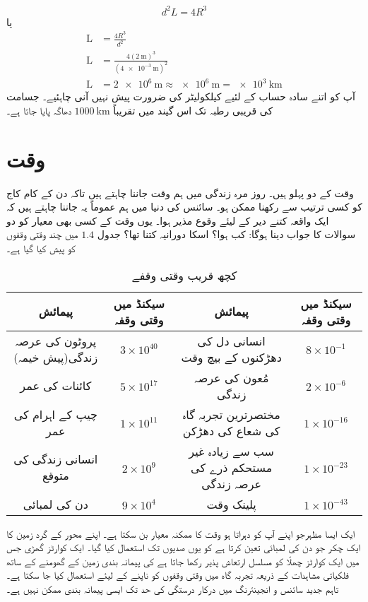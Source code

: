 \documentclass[leqno, b5paper]{khalid-urdu-book}
\begin{document}
	\[d^{2}L =4R^{3}\]
	یا
	\begin{align*}
		\text{L} &= \frac{4R^{3}}{d^{2}}\\
		\text{L} &= \frac{4\left(\SI{2}{\meter}\right)^{3}}{\left(\SI{4 e-3}{\meter}\right)^{2}}\\
		\text{L} &= \SI{2e6}{\meter}\approx\SI{e6}{\meter} =\SI{e3}{\kilo\meter}
	\end{align*}
	آپ کو اتنے سادہ حساب کے لئیے کیلکولیٹر کی ضرورت پیش نہیں آنی چاہئیے۔ جسامت کی قریبی رطبہ تک اس گیند میں تقریباً $\SI{1000}{\kilo\meter}$ دھاگہ پایا جاتا ہے۔
	\section{وقت}
	وقت کے دو پہلو ہیں۔ روز مرہ زندگی میں ہم وقت جاننا چاہتے ہیں تاکہ دن کے کام کاج کو کسی ترتیب سے رکھنا ممکن ہو۔ سائنس کی دنیا میں ہم عموماً یہ جاننا چاہتے ہیں کہ ایک واقعہ کتنے دیر کے لیئے وقوع مذیر ہوا۔ یوں وقت کے کسی بھی معیار کو دو سوالات کا جواب دینا ہوگا: کب ہوا؟ اسکا دورانیہ کتنا تھا؟ جدول $\num{1.4}$ میں چند وقتی وقفوں کو پیش کیا گیا ہے۔
	
	\begin{table}[h!]
		\centering
		\begin{tabular}{|c c|c c|}
			\hline
			پیمائش & سیکنڈ میں وقتی وقفہ & پیمائش & سیکنڈ میں وقتی وقفہ\\
			\hline\hline
			پروٹون کی عرصہ زندگی(پیش خیمہ) & $3\times 10^{40}$ & انسانی دل کی دھڑکنوں کے بیچ وقت & $8\times 10^{-1}$\\
			\hline
			کائنات کی عمر & $5\times 10^{17}$ & مُعون کی عرصہ زندگی & $2\times 10^{-6}$\\
			\hline
			چیپ کے اہرام کی عمر & $1\times 10^{11}$ & مختصرترین تجربہ گاہ کی شعاع کی دھڑکن & $1\times 10^{-16}$\\
			\hline
			انسانی زندگی کی متوقع & $2\times 10^{9}$ & سب سے زیادہ غیر مستحکم ذرے کی عرصہ زندگی & $1\times 10^{-23}$\\
			\hline
			دن کی لمبائی & $9\times 10^{4}$ & پلینک وقت & $1\times 10^{-43}$\\
			\hline
		\end{tabular}
	\caption{کچھ قریب وقتی وقفے}
	\label{tab:my_label}
	\end{table}
ایک ایسا مظہرجو اپنے آپ کو دہراتا ہو وقت کا ممکنہ معیار بن سکتا ہے۔ اپنے محور کے گرد زمین کا ایک چکر جو دن کی لمبائی تعین کرتا ہے کو یوں صدیوں تک استعمال کیا گیا۔ ایک کوارٹز گھڑی جس میں ایک کوارٹز چھلّا کو مسلسل ارتعاش پذیر رکھا جاتا ہے کی پیمانہ بندی زمین کے گھومنے کے ساتھ فلکیاتی مشاہدات کے ذریعہ تجربہ گاہ میں وقتی وقفوں کو ناپنے کے لیئے استعمال کیا جا سکتا ہے۔ تاہم جدید سائنس و انجینئرنگ میں درکار درستگی کی حد تک ایسی پیمانہ بندی ممکن نہیں ہے۔
\end{document}
